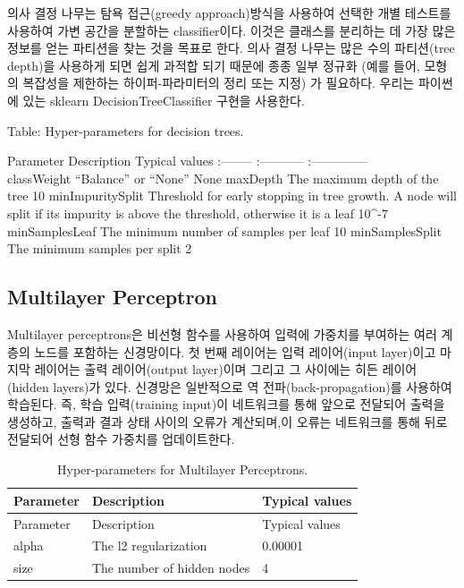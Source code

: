 \documentclass[11pt]{book}
\theoremstyle{definition}
\theoremstyle{definition}
\theoremstyle{definition}
\theoremstyle{remark}
\begin{document}
의사 결정 나무는 탐욕 접근(greedy approach)방식을 사용하여 선택한 개별
테스트를 사용하여 가변 공간을 분할하는 classifier이다. 이것은 클래스를
분리하는 데 가장 많은 정보를 얻는 파티션을 찾는 것을 목표로 한다. 의사
결정 나무는 많은 수의 파티션(tree depth)을 사용하게 되면 쉽게 과적합
되기 때문에 종종 일부 정규화 (예를 들어, 모형의 복잡성을 제한하는
하이퍼-파라미터의 정리 또는 지정) 가 필요하다. 우리는 파이썬에 있는
sklearn DecisionTreeClassifier 구현을 사용한다. 

Table: \label{tab:decisionTreeParameters} Hyper-parameters for decision
trees.

\textbar{} Parameter\textbar{} Description \textbar{} Typical values
\textbar{} \textbar{}:-------- \textbar{}:-----------
\textbar{}:-------------- \textbar{}\\
\textbar{} classWeight \textbar{} ``Balance'' or ``None'' \textbar{}
None \textbar{} \textbar{} maxDepth \textbar{} The maximum depth of the
tree \textbar{} 10 \textbar{} \textbar{} minImpuritySplit \textbar{}
Threshold for early stopping in tree growth. A node will split if its
impurity is above the threshold, otherwise it is a leaf \textbar{}
10\^{}-7\textbar{} \textbar{} minSamplesLeaf \textbar{} The minimum
number of samples per leaf \textbar{} 10 \textbar{} \textbar{}
minSamplesSplit \textbar{} The minimum samples per split \textbar{} 2
\textbar{}

\subsection{Multilayer Perceptron}\label{multilayer-perceptron}

Multilayer perceptrons은 비선형 함수를 사용하여 입력에 가중치를 부여하는
여러 계층의 노드를 포함하는 신경망이다. 첫 번째 레이어는 입력
레이어(input layer)이고 마지막 레이어는 출력 레이어(output layer)이며
그리고 그 사이에는 히든 레이어(hidden layers)가 있다. 신경망은
일반적으로 역 전파(back-propagation)를 사용하여 학습된다. 즉, 학습
입력(training input)이 네트워크를 통해 앞으로 전달되어 출력을 생성하고,
출력과 결과 상태 사이의 오류가 계산되며,이 오류는 네트워크를 통해 뒤로
전달되어 선형 함수 가중치를 업데이트한다. 
 

\begin{longtable}[]{@{}lll@{}}
\caption{\label{tab:mpParameters} Hyper-parameters for Multilayer
Perceptrons.}\tabularnewline
\toprule
Parameter & Description & Typical values\tabularnewline
\midrule
\endfirsthead
\toprule
Parameter & Description & Typical values\tabularnewline
\midrule
\endhead
alpha & The l2 regularization & 0.00001\tabularnewline
size & The number of hidden nodes & 4\tabularnewline
\bottomrule
\end{longtable}
\end{document}
